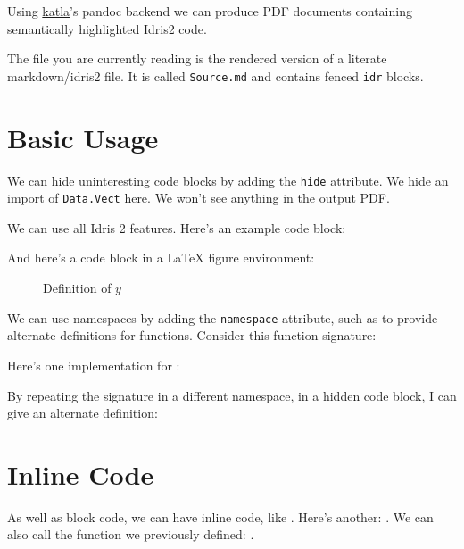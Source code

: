 Using \href{https://github.com/idris-community/katla}{katla}'s pandoc
backend we can produce PDF documents containing semantically highlighted
Idris2 code.

The file you are currently reading is the rendered version of a literate
markdown/idris2 file. It is called \texttt{Source.md} and contains
fenced \texttt{idr} blocks.

\hypertarget{basic-usage}{%
\section{Basic Usage}\label{basic-usage}}

We can hide uninteresting code blocks by adding the \texttt{hide}
attribute. We hide an import of \texttt{Data.Vect} here. We won't see
anything in the output PDF.

We can use all Idris 2 features. Here's an example code block:

\KatlaSnippet{}

And here's a code block in a \LaTeX{} figure environment:

\newcommand\myfig[2]{
    \begin{figure}[h]
    \centering
    #2
    \caption{#1}
    \end{figure}
}

\myfig{Definition of $y$}{

\KatlaSnippet{}

}

We can use namespaces by adding the \texttt{namespace} attribute, such
as to provide alternate definitions for functions. Consider this
function signature:

\KatlaSnippet{}

Here's one implementation for \KatlaSnippet{}:

\KatlaSnippet{}

By repeating the signature in a different namespace, in a hidden code
block, I can give an alternate definition:

\KatlaSnippet{}

\hypertarget{inline-code}{%
\section{Inline Code}\label{inline-code}}

As well as block code, we can have inline code, like
\KatlaSnippet{}. Here's another: \KatlaSnippet{}. We can
also call the function we previously defined: \KatlaSnippet{}.

